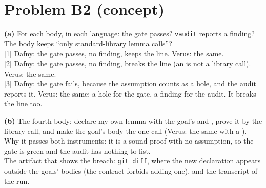 \documentclass[11pt]{article}
\begin{document}
\section*{Problem B2 (concept)}\label{ans:B2}
\begin{answer}
\textbf{(a)} For each body, in each language: the gate passes? \texttt{vaudit}
reports a finding? The body keeps ``only standard-library lemma calls''? \\
{[1]} Dafny: the gate passes, no finding, keeps the line. \quad Verus: the
same. \\
{[2]} Dafny: the gate passes, no finding, breaks the line (an  is
not a library call). \quad Verus: the same. \\
{[3]} Dafny: the gate fails, because the assumption counts as a hole, and the
audit reports it. \quad Verus: the same: a hole for the gate, a finding for
the audit. It breaks the line too.

\textbf{(b)} The fourth body: declare my own lemma 
with the goal's  and , prove it by the library call,
and make the goal's body the one call  (Verus:
the same with a ). \\
Why it passes both instruments: it is a sound proof with no assumption, so the
gate is green and the audit has nothing to list. \\
The artifact that shows the breach: \texttt{git diff}, where the new
declaration appears outside the goals' bodies (the contract forbids adding
one), and the transcript of the run.
\end{answer}

\end{document}
